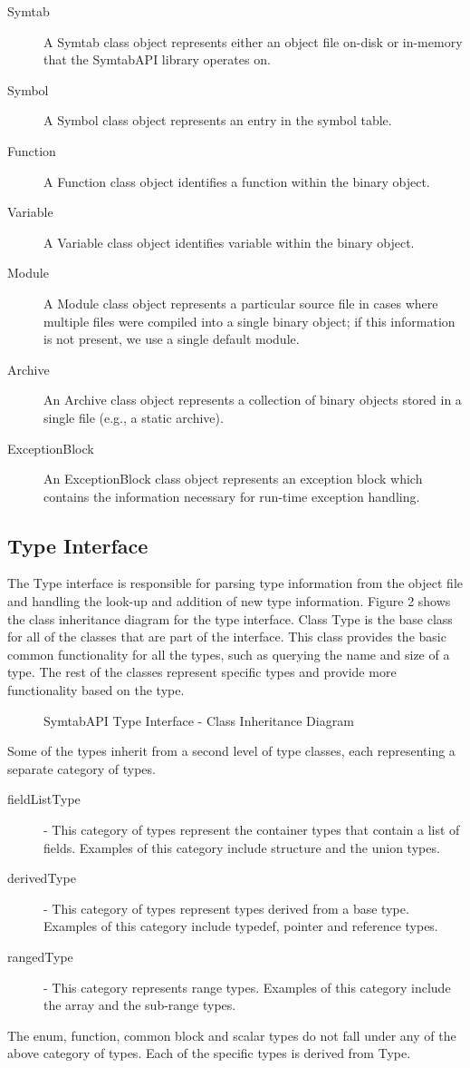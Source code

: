 \begin{description}
\item[Symtab] A Symtab class object represents either an object file on-disk or in-memory that the SymtabAPI library operates on.
\item[Symbol] A Symbol class object represents an entry in the symbol table.
\item[Function] A Function class object identifies a function within the binary object.
\item[Variable] A Variable class object identifies variable within the binary object.
\item[Module] A Module class object represents a particular source file in cases where multiple files were compiled into a single binary object; if this information is not present, we use a single default module.
\item[Archive] An Archive class object represents a collection of binary objects stored in a single file (e.g., a static archive). 
\item[ExceptionBlock] An ExceptionBlock class object represents an exception block which contains the information necessary for run-time exception handling.
\end{description}

\subsection{Type Interface}
 The Type interface is responsible for parsing type information from the object file and handling the look-up and addition of new type information. Figure 2 shows the class inheritance diagram for the type interface. Class Type is the base class for all of the classes that are part of the interface. This class provides the basic common functionality for all the types, such as querying the name and size of a type. The rest of the classes represent specific types and provide more functionality based on the type. 

 \begin{figure}
     \caption{SymtabAPI Type Interface - Class Inheritance Diagram}
     \label{fig:class-inherit}
 \end{figure}

Some of the types inherit from a second level of type classes, each representing a separate category of types. 
\begin{description}
\item[fieldListType] - This category of types represent the container types that contain a list of fields. Examples of this category include structure and the union types. 
\item[derivedType] - This category of types represent types derived from a base type. Examples of this category include typedef, pointer and reference types. 
\item[rangedType] - This category represents range types. Examples of this category include the array and the sub-range types. 
\end{description}
The enum, function, common block and scalar types do not fall under any of the above category of types. Each of the specific types is derived from Type.


